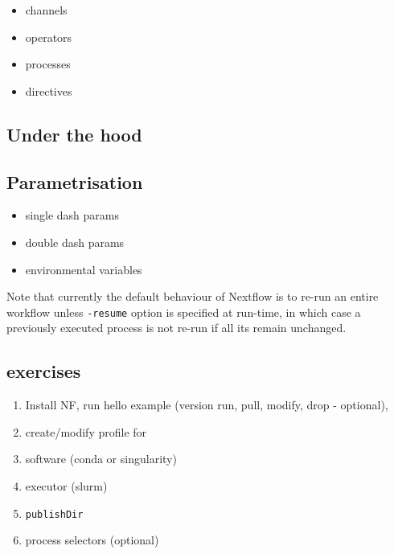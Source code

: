 \begin{itemize}
 \item channels
 \item operators
 \item processes
 \item directives
\end{itemize}

\subsection {Under the hood}



\subsection{Parametrisation}

\begin{itemize}
 \item single dash params
 \item double dash params
 \item environmental variables
\end{itemize}

\begin{note}
Note that currently the default behaviour of Nextflow is to re-run an entire workflow 
unless \texttt{-resume} option is specified at run-time, in which case a previously 
executed process is not re-run if all its remain unchanged.

\end{note}


\subsection{exercises}

\begin{enumerate}
 \item Install NF, run hello example (version run, pull, modify, drop - optional), 
 \item create/modify profile for 
  \item software (conda or singularity)
  \item executor (slurm)
 \item \texttt{publishDir}
 \item process selectors (optional)
\end{enumerate}


